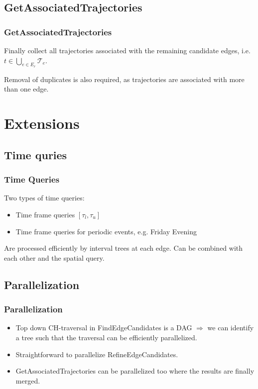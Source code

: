 \documentclass{beamer}
\newcommand{\findEdgeCandidates}{FindEdgeCandidates\xspace}
\newcommand{\refineEdgeCandidates}{RefineEdgeCandidates\xspace}
\newcommand{\getAssociatedTrajectories}{GetAssociatedTrajectories\xspace}
\begin{document}
\subsection{\getAssociatedTrajectories}
\begin{frame}
	\frametitle{\getAssociatedTrajectories}
	Finally collect all trajectories associated with the remaining candidate edges, i.e. $t \in \bigcup_{e \in E_r} \mathcal{T}_e $.\pause

	Removal of duplicates is also required, as trajectories are associated with more than one edge.
\end{frame}

\section{Extensions}

\subsection{Time quries}
\begin{frame}
	\frametitle{Time Queries}
	Two types of time queries: \pause
	\begin{itemize}
		\item Time frame queries $[\tau_l, \tau_u]$ \pause
		\item Time frame queries for periodic events, e.g. Friday Evening \pause
	\end{itemize}
	Are processed efficiently by interval trees at each edge. \pause
	Can be combined with each other and the spatial query.
\end{frame}

\subsection{Parallelization}
\begin{frame}
	\frametitle{Parallelization}
	\begin{itemize}
		\item<1-> Top down CH-traversal in \findEdgeCandidates is a DAG \pause $\Rightarrow$ we can identify a tree such that the traversal can be efficiently parallelized.
		\item<2-> Straightforward to parallelize \refineEdgeCandidates.
		\item<3-> \getAssociatedTrajectories can be parallelized too where the results are finally merged.
	\end{itemize}
\end{frame}
\end{document}
